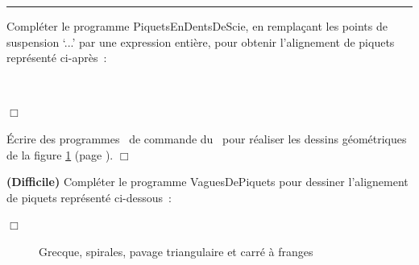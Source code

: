 \noindent \rule{137mm}{0.1mm} %
\begin{exercice}{ Compléter le programme {\idt PiquetsEnDentsDeScie}, en remplaçant les
points de suspension `{\idt ...}' par une expression entière, pour
ob\-te\-nir l'alignement de piquets représenté ci-après~:
\clearpage

\raggedright{
\vspace*{20mm}%
\ \\%
}



\noindent $\Box$}\end{exercice}
\begin{exercice}{ Écrire des programmes \python\ de commande du \robot\ pour réaliser les
dessins géométriques de la figure  \ref{fig:spcf} (page  \pageref{fig:spcf}). $\Box$}\end{exercice}
\begin{exercice}{{\bf (Difficile)} Compléter le programme {\idt VaguesDePiquets} pour
des\-si\-ner l'alignement de piquets représenté ci-dessous~:

\pagebreak[3]
\raggedright{
\vspace{0.5cm}

}


\noindent $\Box$}\end{exercice}
\begin{figure}[hb]%
\caption{Grecque, spirales, pavage triangulaire et carré à franges}
 \label{fig:spcf}
\end{figure}

\clearpage

